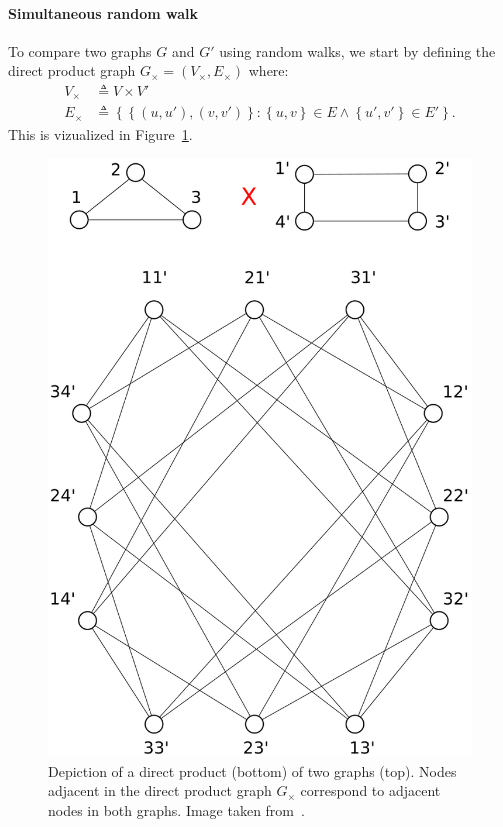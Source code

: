             \paragraph{Simultaneous random walk}
                To compare two graphs \(G\) and \(G'\) using random walks, we start by defining the direct product graph $G_{\times} = \left(V_{\times}, E_{\times}\right)$ where:
                \begin{align}
                    \label{eq::direct_product_graph}
                    V_{\times} &\triangleq V \times V'\\
                    E_{\times} &\triangleq \left\{\left\{(u, u'), (v, v')\right\}: \left\{u,v\right\} \in E \wedge \left\{u',v'\right\} \in E'\right\}.
                \end{align}
                This is vizualized in Figure~\ref{fig::direct_product_graph}.
                \begin{figure}[htbp]
                    \centering
                    \includegraphics[height=.4\textheight]{images/related_work/direct_product_graphs}
                    \caption[
                        Depiction of a direct product of two graphs.
                    ]{
                        \label{fig::direct_product_graph}
                        Depiction of a direct product (bottom) of two graphs (top).
                        Nodes adjacent in the direct product graph $G_{\times}$ correspond to adjacent nodes in both graphs.
                        Image taken from~\parencite{vishwanathan2010graph}.
                    }
                \end{figure}

